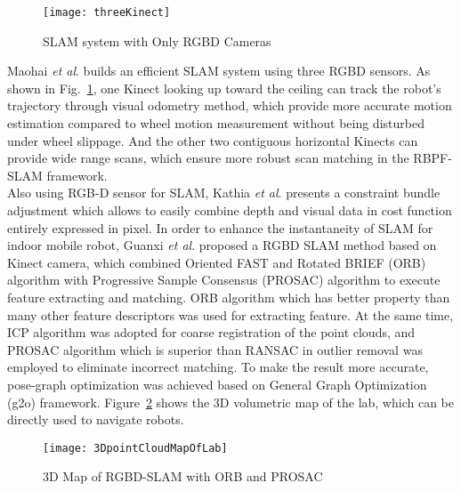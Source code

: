 %
\begin{figure}[t]
\centering
\texttt{[image: threeKinect]}
\caption{SLAM system with Only RGBD Cameras \cite{RGBDSLAMsystem_2013}}
\label{threeKinect}
\end{figure}%
%
Maohai \textit{et al}. \cite{RGBDSLAMsystem_2013} builds an efficient SLAM system using three RGBD sensors. As shown in Fig.~\ref{threeKinect}, one Kinect looking up toward the ceiling can track the robot's trajectory through visual odometry method, which provide more accurate motion estimation compared to wheel motion measurement without being disturbed under wheel slippage. And the other two contiguous horizontal Kinects can provide wide range scans, which ensure more robust scan matching in the RBPF-SLAM framework. %
\\\indent
%
Also using RGB-D sensor for SLAM, Kathia \textit{et al}. \cite{bundleSLAMRGBD_2015} presents a constraint bundle adjustment which allows to easily combine depth and visual data in cost function entirely expressed in pixel. In order to enhance the instantaneity of SLAM for indoor mobile robot, Guanxi \textit{et al}. \cite{indorRGBDSLAM_2015} proposed a RGBD SLAM method based on Kinect camera, which combined Oriented FAST and Rotated BRIEF (ORB) algorithm with Progressive Sample Consensus (PROSAC) algorithm to execute feature extracting and matching. %
%
%
ORB algorithm which has better property than many other feature descriptors was used for extracting feature. At the same time, ICP algorithm was adopted for coarse registration of the point clouds, and PROSAC algorithm which is superior than RANSAC in outlier removal was employed to eliminate incorrect matching. To make the result more accurate, pose-graph optimization was achieved based on General Graph Optimization (g2o) framework. Figure~\ref{3DpointCloudMapOfLab} shows the 3D volumetric map of the lab, which can be directly used to navigate robots.
\\\indent%
\begin{figure}[t]
\centering
\texttt{[image: 3DpointCloudMapOfLab]}
\caption{3D Map of RGBD-SLAM with ORB and PROSAC \cite{indorRGBDSLAM_2015}}
\label{3DpointCloudMapOfLab}
\end{figure}%
